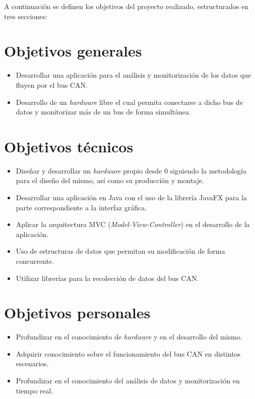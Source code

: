 
A continuación se definen los objetivos del proyecto realizado, estructurados en tres secciones:


\section{Objetivos generales}\label{objetivos-generales}

\begin{itemize}

\item
  Desarrollar una aplicación para el análisis y monitorización de  los datos que fluyen por el bus CAN.
\item
  Desarrollo de un \emph{hardware} libre el cual permita conectarse a dicho bus de datos y monitorizar más de un bus de forma simultánea.

  
\end{itemize}

\section{Objetivos técnicos}\label{objetivos-tecnicos}

\begin{itemize}

\item
  Diseñar y desarrollar un \emph{hardware} propio desde 0 siguiendo la metodología para el diseño del mismo, así como su producción y montaje.
\item
  Desarrollar una aplicación en Java con el uso de la librería JavaFX para la parte correspondiente a la interfaz gráfica.
\item
  Aplicar la arquitectura MVC (\emph{Model-View-Controller}) en el desarrollo de la aplicación.
\item
  Uso de estructuras de datos que permitan su modificación de forma concurrente.
\item
  Utilizar librerías para la recolección de datos del bus CAN.
\end{itemize}

\section{Objetivos personales}\label{objetivos-personales}

\begin{itemize}

\item
  Profundizar en el conocimiento de \emph{hardware} y en el desarrollo del mismo.
\item
  Adquirir conocimiento sobre el funcionamiento del bus CAN en distintos escenarios.
\item
  Profundizar en el conocimiento del análisis de datos y monitorización en tiempo real.

\end{itemize}